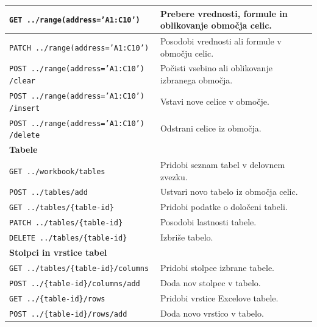 \documentclass[a4paper, 12pt]{book}
\begin{document}
\begin{longtable}{|p{7cm}|p{7.5cm}|}
\texttt{GET ../range(address='A1:C10')} &
Prebere vrednosti, formule in oblikovanje območja celic. \\
\hline

\texttt{PATCH ../range(address='A1:C10')} &
Posodobi vrednosti ali formule v območju celic. \\
\hline

\texttt{POST ../range(address='A1:C10')
/clear} &
Počisti vsebino ali oblikovanje izbranega območja. \\
\hline

\texttt{POST ../range(address='A1:C10')
/insert} &
Vstavi nove celice v območje. \\
\hline

\texttt{POST ../range(address='A1:C10')
/delete} &
Odstrani celice iz območja. \\
\hline

\multicolumn{2}{|l|}{\textbf{Tabele}} \\
\hline

\texttt{GET ../workbook/tables} &
Pridobi seznam tabel v delovnem zvezku. \\
\hline

\texttt{POST ../tables/add} &
Ustvari novo tabelo iz območja celic. \\
\hline

\texttt{GET ../tables/\{table-id\}} &
Pridobi podatke o določeni tabeli. \\
\hline

\texttt{PATCH ../tables/\{table-id\}} &
Posodobi lastnosti tabele. \\
\hline

\texttt{DELETE ../tables/\{table-id\}} &
Izbriše tabelo. \\
\hline

\multicolumn{2}{|l|}{\textbf{Stolpci in vrstice tabel}} \\
\hline

\texttt{GET ../tables/\{table-id\}/columns} &
Pridobi stolpce izbrane tabele. \\
\hline

\texttt{POST ../\{table-id\}/columns/add} &
Doda nov stolpec v tabelo. \\
\hline

\texttt{GET ../\{table-id\}/rows} &
Pridobi vrstice Excelove tabele. \\
\hline

\texttt{POST ../\{table-id\}/rows/add} &
Doda novo vrstico v tabelo. \\
\hline


\end{longtable}
\end{document}
